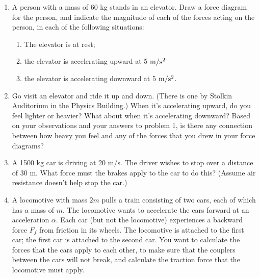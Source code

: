 \documentclass[12pt]{article}
\begin{document}
\Large
\centerline{}
\normalsize
\centerline{}

\begin{enumerate}

 	\item{A person with a mass of 60 kg stands in an elevator. Draw a force diagram for the
 	person, and indicate the magnitude of each of the forces acting on the person, in each
 	of the following situations:}
\begin{enumerate}
 	\item{The elevator is at rest;}
 	\item{the elevator is accelerating upward at 5 $\rm m/\rm s^2$} 
 	\item{the elevator is accelerating downward at 5 $\rm m/\rm s^2$.}
\end{enumerate}

 	\item{Go visit an elevator and ride it up and down. (There is one by Stolkin Auditorium in the Physics Building.) When it’s accelerating upward, do you
 	feel lighter or heavier? What about when it’s accelerating downward? Based on your
 	observations and your answers to problem 1, is there any connection between how
 	heavy you feel and any of the forces that you drew in your force diagrams?}
 	
 	
 	 \item{A 1500 kg car is driving at 20 m/s. The driver wishes to stop over a distance of 30 m. What force must the brakes apply to the car to do this? (Assume air resistance doesn't help stop the car.)}

\item A locomotive with mass $2m$ pulls a train consisting of two cars, each of which has a mass of $m$. The locomotive wants to accelerate the cars forward at an acceleration $\alpha$. Each car (but not the locomotive) experiences a backward force 
$F_f$ from friction in its wheels. The locomotive is attached to the first car; the first car is attached to the second car. You want to calculate the forces that the cars apply to each other, to make sure that the couplers 
between the cars will not break, and calculate the traction force that the locomotive must apply.


\end{enumerate}
\end{document}
